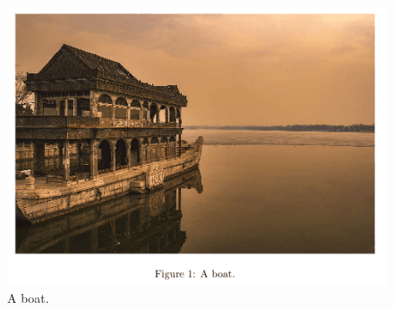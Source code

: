 \documentclass[12pt]{article}
\begin{document}
\begin{figure}
  \includegraphics[width=\linewidth]{boat.png}
  \caption{A boat.}
  \label{fig:boat1}
\end{figure}
\end{document}
